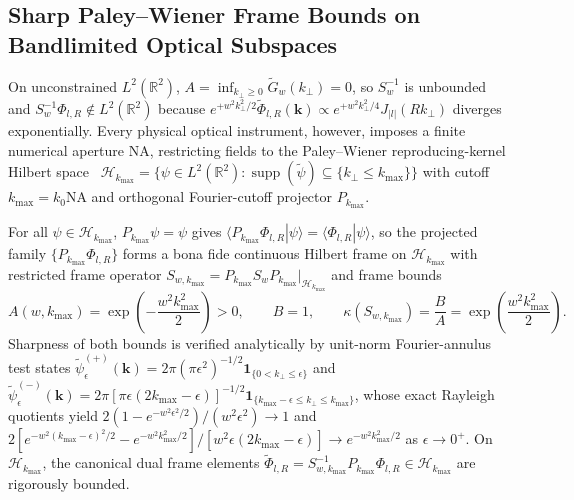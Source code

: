 \documentclass{optica-article}
\newcommand{\braket}[2]{\langle #1 | #2 \rangle}
\newcommand{\abs}[1]{\lvert #1 \rvert}
\begin{document}
\subsection{Sharp Paley--Wiener Frame Bounds on Bandlimited Optical Subspaces}

On unconstrained $L^2(\mathbb{R}^2)$, $A = \inf_{k_\perp \ge 0}\widetilde{G}_w(k_\perp) = 0$, so $S_w^{-1}$ is unbounded and $S_w^{-1}\Phi_{l,R} \notin L^2(\mathbb{R}^2)$ because $e^{+w^2 k_\perp^2/2}\widetilde{\Phi}_{l,R}(\mathbf{k}) \propto e^{+w^2 k_\perp^2/4}J_{\abs{l}}(R k_\perp)$ diverges exponentially. Every physical optical instrument, however, imposes a finite numerical aperture $\mathrm{NA}$, restricting fields to the Paley--Wiener reproducing-kernel Hilbert space~\cite{PaulsenRaghupathi2016} $\mathcal{H}_{k_{\max}} = \{\psi \in L^2(\mathbb{R}^2) : \operatorname{supp}(\widetilde{\psi}) \subseteq \{k_\perp \le k_{\max}\}\}$ with cutoff $k_{\max} = k_0\mathrm{NA}$ and orthogonal Fourier-cutoff projector $P_{k_{\max}}$.

For all $\psi \in \mathcal{H}_{k_{\max}}$, $P_{k_{\max}}\psi = \psi$ gives $\braket{P_{k_{\max}}\Phi_{l,R}}{\psi} = \braket{\Phi_{l,R}}{\psi}$, so the projected family $\{P_{k_{\max}}\Phi_{l,R}\}$ forms a bona fide continuous Hilbert frame on $\mathcal{H}_{k_{\max}}$ with restricted frame operator $S_{w,k_{\max}} = P_{k_{\max}} S_w P_{k_{\max}}\big|_{\mathcal{H}_{k_{\max}}}$ and frame bounds
\begin{equation}
  A(w,k_{\max}) = \exp\!\left(-\frac{w^2 k_{\max}^2}{2}\right) > 0, \qquad B = 1, \qquad \kappa(S_{w,k_{\max}}) = \frac{B}{A} = \exp\!\left(\frac{w^2 k_{\max}^2}{2}\right).
  \label{eq:pw_bounds}
\end{equation}
Sharpness of both bounds is verified analytically by unit-norm Fourier-annulus test states $\widetilde{\psi}_\epsilon^{(+)}(\mathbf{k}) = 2\pi(\pi\epsilon^2)^{-1/2}\allowbreak\mathbf{1}_{\{0<k_\perp\le\epsilon\}}$ and $\widetilde{\psi}_\epsilon^{(-)}(\mathbf{k}) = 2\pi[\pi\epsilon(2k_{\max}-\epsilon)]^{-1/2}\allowbreak\mathbf{1}_{\{k_{\max}-\epsilon\le k_\perp\le k_{\max}\}}$, whose exact Rayleigh quotients yield $2(1-e^{-w^2\epsilon^2/2})/(w^2\epsilon^2) \to 1$ and $2[e^{-w^2(k_{\max}-\epsilon)^2/2} - e^{-w^2 k_{\max}^2/2}]/[w^2\epsilon(2k_{\max}-\epsilon)] \to e^{-w^2 k_{\max}^2/2}$ as $\epsilon \to 0^+$. On $\mathcal{H}_{k_{\max}}$, the canonical dual frame elements $\widetilde{\Phi}_{l,R} = S_{w,k_{\max}}^{-1}P_{k_{\max}}\Phi_{l,R} \in \mathcal{H}_{k_{\max}}$ are rigorously bounded.
\end{document}
